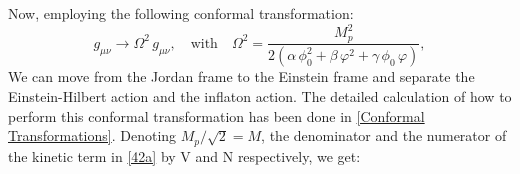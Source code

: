 \documentclass[aps,prd,reprint,preprintnumbers,showpacs,floatfix,nofootinbib,superscript address]{revtex4-2}
\begin{document}

Now, employing the following conformal transformation: 
\[
g_{\mu\nu}\rightarrow \Omega^2\,g_{\mu\nu},\quad\text{with}\quad \Omega^2 = \frac{M_p^2}{2(\alpha\,\phi_0^2+\beta\,\varphi^2+\gamma\,\phi_0\,\varphi)},
\]
We can move from the Jordan frame to the Einstein frame and separate the Einstein-Hilbert action and the inflaton action. The detailed calculation of how to perform this conformal transformation has been done in \cref{Conformal Transformations}. Denoting $M_p/\sqrt{2} = M$, the denominator and the numerator of the kinetic term in \cref{42a} by V and N respectively, we get:
\end{document}
